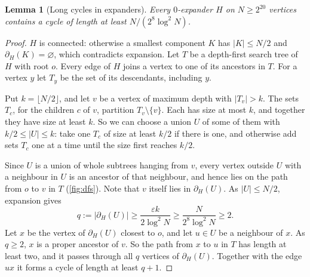 \documentclass[11pt]{article}
\newtheorem{lemma}[theorem]{Lemma}
\theoremstyle{definition}
\theoremstyle{remark}
\numberwithin{equation}{section}
\numberwithin{figure}{section}
\numberwithin{table}{section}
\newcommand{\eps}{\varepsilon}
\newcommand{\NN}{\partial}
\begin{document}
\begin{lemma}[Long cycles in expanders]\label{lem:longcycle}
Every $0$-expander $H$ on $N\ge2^{20}$ vertices contains a cycle of length at
least $N/(2^8\log^2N)$.
\end{lemma}

\begin{proof}
$H$ is connected: otherwise a smallest component $K$ has $|K|\le N/2$ and
$\NN_H(K)=\varnothing$, which contradicts expansion. Let $T$ be a depth-first
search tree of $H$ with root $o$. Every edge of $H$ joins a vertex to one of
its ancestors in $T$. For a vertex $y$ let $T_y$ be the set of its descendants,
including $y$.

Put $k=\lfloor N/2\rfloor$, and let $v$ be a vertex of maximum depth with
$|T_v|>k$. The sets $T_c$, for the children $c$ of $v$, partition
$T_v\setminus\{v\}$. Each has size at most $k$, and together they have size at
least $k$. So we can choose a union $U$ of some of them with $k/2\le|U|\le k$:
take one $T_c$ of size at least $k/2$ if there is one, and otherwise add sets
$T_c$ one at a time until the size first reaches $k/2$.

Since $U$ is a union of whole subtrees hanging from $v$, every vertex outside
$U$ with a neighbour in $U$ is an ancestor of that neighbour, and hence lies on
the path from $o$ to $v$ in $T$ (\cref{fig:dfs}). Note that $v$ itself lies in
$\NN_H(U)$. As $|U|\le N/2$, expansion gives
\[
q:=|\NN_H(U)|\ge\frac{\eps k}{2\log^2N}\ge\frac{N}{2^8\log^2N}\ge 2.
\]
Let $x$ be the vertex of $\NN_H(U)$ closest to $o$, and let $u\in U$ be a
neighbour of $x$. As $q\ge2$, $x$ is a proper ancestor of $v$. So the path from
$x$ to $u$ in $T$ has length at least two, and it passes through all $q$
vertices of $\NN_H(U)$. Together with the edge $ux$ it forms a cycle of length
at least $q+1$.
\end{proof}
\end{document}

